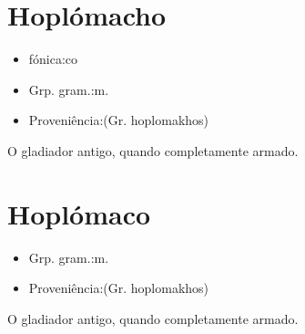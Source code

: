 \documentclass{article}
\begin{document}
\section{Hoplómacho}
\begin{itemize}
\item {fónica:co}
\end{itemize}
\begin{itemize}
\item {Grp. gram.:m.}
\end{itemize}
\begin{itemize}
\item {Proveniência:(Gr. \textunderscore hoplomakhos\textunderscore )}
\end{itemize}
O gladiador antigo, quando completamente armado.
\section{Hoplómaco}
\begin{itemize}
\item {Grp. gram.:m.}
\end{itemize}
\begin{itemize}
\item {Proveniência:(Gr. \textunderscore hoplomakhos\textunderscore )}
\end{itemize}
O gladiador antigo, quando completamente armado.
\end{document}
